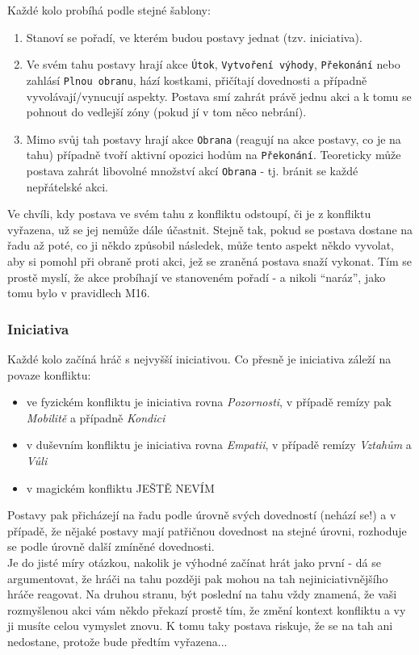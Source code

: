 Každé kolo probíhá podle stejné šablony:

\begin{enumerate}
\item Stanoví se pořadí, ve kterém budou postavy jednat (tzv. iniciativa).
\item Ve svém tahu postavy hrají akce \texttt{Útok}, \texttt{Vytvoření výhody}, \texttt{Překonání} nebo zahlásí \texttt{Plnou obranu}, hází kostkami, přičítají dovednosti a případně vyvolávají/vynucují aspekty. Postava smí zahrát právě jednu akci a k tomu se pohnout do vedlejší zóny (pokud jí v tom něco nebrání).
\item Mimo svůj tah postavy hrají akce \texttt{Obrana} (reagují na akce postavy, co je na tahu) případně tvoří aktivní opozici hodům na \texttt{Překonání}. Teoreticky může postava zahrát libovolné množství akcí \texttt{Obrana} - tj. bránit se každé nepřátelské akci.
\end{enumerate}

Ve chvíli, kdy postava ve svém tahu z konfliktu odstoupí, či je z konfliktu vyřazena, už se jej nemůže dále účastnit. Stejně tak, pokud se postava dostane na řadu až poté, co ji někdo způsobil následek, může tento aspekt někdo vyvolat, aby si pomohl při obraně proti akci, jež se zraněná postava snaží vykonat. Tím se prostě myslí, že akce probíhají ve stanoveném pořadí - a nikoli ``naráz'', jako tomu bylo v pravidlech M16.

\subsubsection{Iniciativa}
\label{sec:iniciativa}

Každé kolo začíná hráč s nejvyšší iniciativou. Co přesně je iniciativa záleží na povaze konfliktu:

\begin{itemize}
\item ve fyzickém konfliktu je iniciativa rovna \textit{Pozornosti}, v případě remízy pak \textit{Mobilitě} a případně \textit{Kondici}
\item v duševním konfliktu je iniciativa rovna \textit{Empatii}, v případě remízy \textit{Vztahům} a \textit{Vůli}
\item v magickém konfliktu JEŠTĚ NEVÍM
\end{itemize}

Postavy pak přicházejí na řadu podle úrovně svých dovedností (nehází se!) a v případě, že nějaké postavy mají patřičnou dovednost na stejné úrovni, rozhoduje se podle úrovně další zmíněné dovednosti.\\
Je do jisté míry otázkou, nakolik je výhodné začínat hrát jako první - dá se argumentovat, že hráči na tahu později pak mohou na tah nejiniciativnějšího hráče reagovat. Na druhou stranu, být poslední na tahu vždy znamená, že vaši rozmyšlenou akci vám někdo překazí prostě tím, že změní kontext konfliktu a vy ji musíte celou vymyslet znovu. K tomu taky postava riskuje, že se na tah ani nedostane, protože bude předtím vyřazena...

